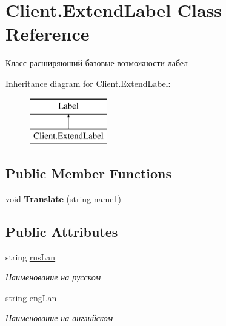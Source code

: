 \hypertarget{class_client_1_1_extend_label}{}\section{Client.\+Extend\+Label Class Reference}
\label{class_client_1_1_extend_label}


Класс расширяюший базовые возможности лабел  


Inheritance diagram for Client.\+Extend\+Label\+:\begin{figure}[H]
\begin{center}
\leavevmode
\includegraphics[height=2.000000cm]{class_client_1_1_extend_label}
\end{center}
\end{figure}
\subsection*{Public Member Functions}
\begin{DoxyCompactItemize}
\item 
\hypertarget{class_client_1_1_extend_label_abdbb5351d8f1e8e5a0a3901dfc67044b}{}\label{class_client_1_1_extend_label_abdbb5351d8f1e8e5a0a3901dfc67044b} 
void {\bfseries Translate} (string name1)
\end{DoxyCompactItemize}
\subsection*{Public Attributes}
\begin{DoxyCompactItemize}
\item 
string \hyperlink{class_client_1_1_extend_label_a77d9ce34371d09953d0fd6423abbc6c6}{rus\+Lan}
\begin{DoxyCompactList}\small\item\em Наименование на русском \end{DoxyCompactList}\item 
string \hyperlink{class_client_1_1_extend_label_a75adae5701c1a1a81f6dca5928d171c2}{eng\+Lan}
\begin{DoxyCompactList}\small\item\em Наименование на английском \end{DoxyCompactList}\end{DoxyCompactItemize}


